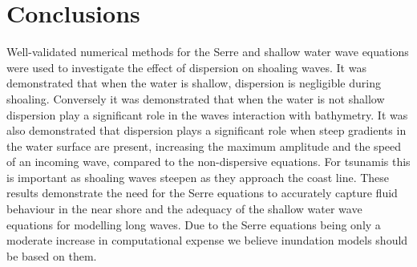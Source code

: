 \documentclass[a4paper,fleqn]{article} %
\begin{document}
\section{Conclusions}
\label{Conclusions}
Well-validated numerical methods for the Serre and shallow water wave equations were used to investigate the effect of dispersion on shoaling waves. It was demonstrated that when the water is shallow, dispersion is negligible during shoaling. Conversely it was demonstrated that when the water is not shallow dispersion play a significant role in the waves interaction with bathymetry. It was also demonstrated that dispersion plays a significant role when steep gradients in the water surface are present, increasing the maximum amplitude and the speed of an incoming wave, compared to the non-dispersive equations. For tsunamis this is important as shoaling waves steepen as they approach the coast line. These results demonstrate the need for the Serre equations to accurately capture fluid behaviour in the near shore and the adequacy of the shallow water wave equations for modelling long waves. Due to the Serre equations being only a moderate increase in computational expense we believe inundation models should be based on them.

\end{document}
